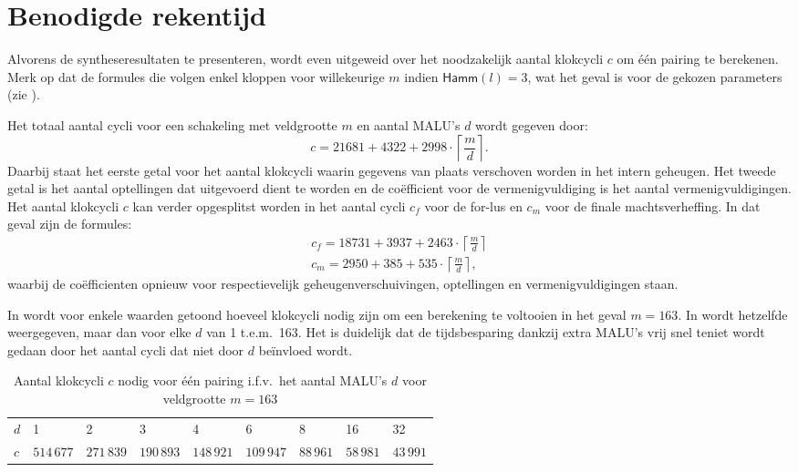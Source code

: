 \section{Benodigde rekentijd}

Alvorens de syntheseresultaten te presenteren, wordt even uitgeweid over het noodzakelijk aantal klokcycli $c$ om \'e\'en pairing te berekenen. Merk op dat de formules die volgen enkel kloppen voor willekeurige $m$ indien $\textsf{Hamm}(l) = 3$, wat het geval is voor de gekozen parameters (zie ).

Het totaal aantal cycli voor een schakeling met veldgrootte $m$ en aantal MALU's $d$ wordt gegeven door:
\[c = 21681 + 4322 + 2998 \cdot \left\lceil \frac{m}{d} \right\rceil.\]
Daarbij staat het eerste getal voor het aantal klokcycli waarin gegevens van plaats verschoven worden in het intern geheugen. Het tweede getal is het aantal optellingen dat uitgevoerd dient te worden en de co\"efficient voor de vermenigvuldiging is het aantal vermenigvuldigingen. Het aantal klokcycli $c$ kan verder opgesplitst worden in het aantal cycli $c_f$ voor de for-lus en $c_m$ voor de finale machtsverheffing. In dat geval zijn de formules:
\[\begin{gathered}
c_f = 18731 + 3937 + 2463 \cdot \left\lceil \frac{m}{d} \right\rceil\\
c_m = 2950 + 385 + 535 \cdot \left\lceil \frac{m}{d} \right\rceil,
\end{gathered}\]
waarbij de co\"efficienten opnieuw voor respectievelijk geheugenverschuivingen, optellingen en vermenigvuldigingen staan.

In  wordt voor enkele waarden getoond hoeveel klokcycli nodig zijn om een berekening te voltooien in het geval $m = 163$. In  wordt hetzelfde weergegeven, maar dan voor elke $d$ van 1 t.e.m.\ 163. Het is duidelijk dat de tijdsbesparing dankzij extra MALU's vrij snel teniet wordt gedaan door het aantal cycli dat niet door $d$ be\"invloed wordt.

\begin{table}[h]
	\caption{Aantal klokcycli $c$ nodig voor \'e\'en pairing i.f.v.\ het aantal MALU's $d$ voor veldgrootte $m = 163$}
	\label{tabel-resultaten-multi-cycles}

	\begin{narrow}{-1cm}{-1cm}
		\centering
		\begin{tabular}{lllllllll}
			\toprule
			$d$	& 1	& 2	& 3	& 4	& 6	& 8	& 16	& 32\\
			$c$	& $514\,677$	& $271\,839$	& $190\,893$	& $148\,921$	& $109\,947$	& $88\,961$	& $58\,981$	& $43\,991$\\
			\bottomrule	
		\end{tabular}
	\end{narrow}
\end{table}

